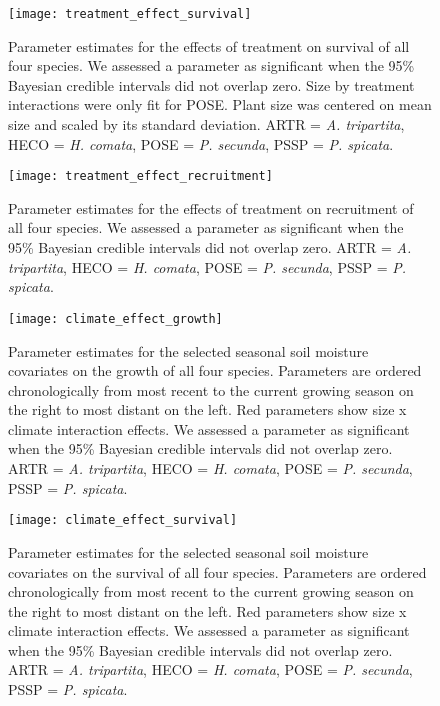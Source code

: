 \documentclass[11pt]{article}
\begin{document}
\begin{figure}[!htbp]
	\centering
	\texttt{[image: treatment\_effect\_survival]}
	\caption{Parameter estimates for the effects of treatment on survival of all four species. We assessed a parameter as significant when the 95\% Bayesian credible intervals did not overlap zero. Size by treatment interactions were only fit for POSE. Plant size was centered on mean size and scaled by its standard deviation.  ARTR = \textit{A. tripartita}, HECO = \textit{H. comata}, POSE = \textit{P. secunda}, PSSP = \textit{P. spicata}. }
	\label{fig:survivalTreat}
\end{figure}

\begin{figure}[!htbp]
	\centering
	\texttt{[image: treatment\_effect\_recruitment]}
	\caption{Parameter estimates for the effects of treatment on recruitment of all four species. We assessed a parameter as significant when the 95\% Bayesian credible intervals did not overlap zero.  ARTR = \textit{A. tripartita}, HECO = \textit{H. comata}, POSE = \textit{P. secunda}, PSSP = \textit{P. spicata}. }
	\label{fig:recruitmentTreat}
\end{figure}

\begin{figure}[!htbp]
	\centering
	\texttt{[image: climate\_effect\_growth]}
	\caption{Parameter estimates for the selected seasonal soil moisture covariates on the growth of all four species. Parameters are ordered chronologically from most recent to the current growing season on the right to most distant on the left. Red parameters show size x climate interaction effects. We assessed a parameter as significant when the 95\% Bayesian credible intervals did not overlap zero.  ARTR = \textit{A. tripartita}, HECO = \textit{H. comata}, POSE = \textit{P. secunda}, PSSP = \textit{P. spicata}. }
	\label{fig:climateGrowth}
\end{figure}

\begin{figure}[!htbp]
	\centering
	\texttt{[image: climate\_effect\_survival]}
	\caption{Parameter estimates for the selected seasonal soil moisture covariates on the survival of all four species. Parameters are ordered chronologically from most recent to the current growing season on the right to most distant on the left. Red parameters show size x climate interaction effects. We assessed a parameter as significant when the 95\% Bayesian credible intervals did not overlap zero.  ARTR = \textit{A. tripartita}, HECO = \textit{H. comata}, POSE = \textit{P. secunda}, PSSP = \textit{P. spicata}. }
	\label{fig:climateSurvival}
\end{figure}
\end{document}
